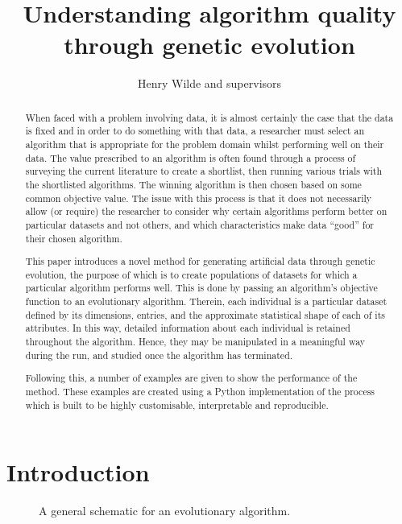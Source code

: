 \documentclass[10pt]{article}
\title{Understanding algorithm quality through genetic evolution}
\author{Henry Wilde and supervisors}
\date{}
\newlength{\imgwidth}
\newcommand{\inputtikz}[3][\imgwidth]{%
    \begin{figure}[htbp]
        \centering
        \resizebox{#1}{!}{%
            
        }
        \caption{#3}
    \end{figure}
}
\begin{document}
\maketitle%

\begin{abstract}
    When faced with a problem involving data, it is almost certainly the case
    that the data is fixed and in order to do something with that data, a
    researcher must select an algorithm that is appropriate for the problem
    domain whilst performing well on their data. The value prescribed to an
    algorithm is often found through a process of surveying the current
    literature to create a shortlist, then running various trials with the
    shortlisted algorithms. The winning algorithm is then chosen based on some
    common objective value. The issue with this process is that it does not
    necessarily allow (or require) the researcher to consider why certain
    algorithms perform better on particular datasets and not others, and which
    characteristics make data ``good'' for their chosen algorithm.

    This paper introduces a novel method for generating artificial data through
    genetic evolution, the purpose of which is to create populations of datasets
    for which a particular algorithm performs well. This is done by passing an
    algorithm's objective function to an evolutionary algorithm. Therein, each
    individual is a particular dataset defined by its dimensions, entries, and
    the approximate statistical shape of each of its attributes. In this way,
    detailed information about each individual is retained throughout the
    algorithm. Hence, they may be manipulated in a meaningful way during the
    run, and studied once the algorithm has terminated.

    Following this, a number of examples are given to show the performance of
    the method. These examples are created using a Python implementation of the
    process which is built to be highly customisable, interpretable and
    reproducible.
\end{abstract}

\newpage%
\section{Introduction}\label{section:introduction}

\inputtikz{tex/flowchart.tex}{%
    A general schematic for an evolutionary algorithm.
}
\end{document}
